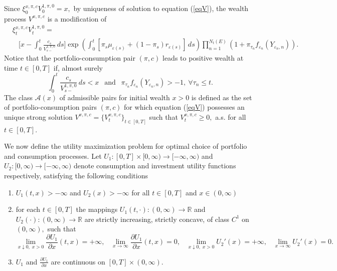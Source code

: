 \documentclass[11pt]{article}
\theoremstyle{plain}
\theoremstyle{definition}
\numberwithin{equation}{section}
\newcommand{\calA}{\mathcal{A}}
\newcommand{\eps}{\varepsilon}
\newcommand{\R}{\mathds{R}}
\begin{document}
Since $\xi_0^{{x,\pi,c}}V_0^{1,\pi,0}=x,$ by uniqueness of solution to equation (\ref{eqV}), the wealth process $V^{x,\pi,c}$ is a modification of
\begin{equation}\label{xiV}
  \begin{split}
&\xi_t^{{x,\pi,c}}V_t^{1,\pi,0}=\\
&\phantom{\gamma t}\biggl[x-\int_0^t\frac{c_s}{V_{s-}^{1,\pi,0}}\,ds\biggr]\exp\left(\int_0^t\left[\pi_s\mu_{\eps(s)}
+(1-\pi_s)r_{\eps(s)}\right]\,ds\right)\prod_{n=1}^{N_t(E)}(1+\pi_{\tau_n}f_{\eps_n}(Y_{\eps_n,n})).
\end{split}
\end{equation}
Notice that the portfolio-consumption pair $(\pi,c)$ leads to positive wealth at time $t\in [0,T]$ if, almost surely
\[
\int_0^t\frac{c_s}{V_{s-}^{1,\pi,0}}\,ds<x \ \ \mbox{ and } \ \ \pi_{\tau_n}f_{\eps_n}(Y_{\eps_n,n})>-1, \ \forall \tau_n\le t.
\]
The class $\calA(x)$ of admissible pairs for initial wealth $x>0$ is defined as the set of portfolio-consumption pairs $(\pi,c)$  for which equation (\ref{eqV}) possesses an unique strong solution $V^{x,\pi,c}=\{V_t^{x,\pi,c}\}_{t\in [0,T]}$ such that $V_t^{x,\pi,c}\geq 0,$ a.s. for all $t\in[0,T].$

We now define the utility maximization problem for optimal choice of portfolio and consumption processes.
Let $U_1 : [0,T] \times [0,\infty) \rightarrow [-\infty,\infty)$ and $U_2 : [0,\infty) \rightarrow [-\infty,\infty)$ denote consumption and
investment utility functions respectively, satisfying the following conditions
%
\begin{enumerate}
\item[(i)] $U_1(t,x) > -\infty$
and $U_2(x) > -\infty$
for all $t\in [0,T]$
and $x \in (0,\infty)$
%
%

\item[(ii)] for each $t \in [0,T]$ the mappings
$U_1(t,\cdot): (0,\infty) \rightarrow \R$
and $U_2(\cdot) : (0,\infty) \rightarrow \R$
are strictly increasing, strictly concave, of class $C^{1}$ on $(0,\infty),$
such that
%
\[
\lim_{x \downarrow 0, \; x > 0} \frac{\partial U_1}{\partial x}(t,x) = +\infty,\;\;\;
\lim_{x \rightarrow \infty}  \frac{\partial U_1}{\partial x}(t,x) = 0,\;\;\;
\lim_{x \downarrow 0, \; x > 0} U_2'(x) = +\infty,\;\;\;
\lim_{x \rightarrow \infty}  U_2'(x) = 0.
\]
\item[(iii)] $U_1$ and
$\frac{\partial U_1}{\partial x}$
are continuous on $[0,T]\times (0,\infty)$.
\end{enumerate}%
\end{document}
